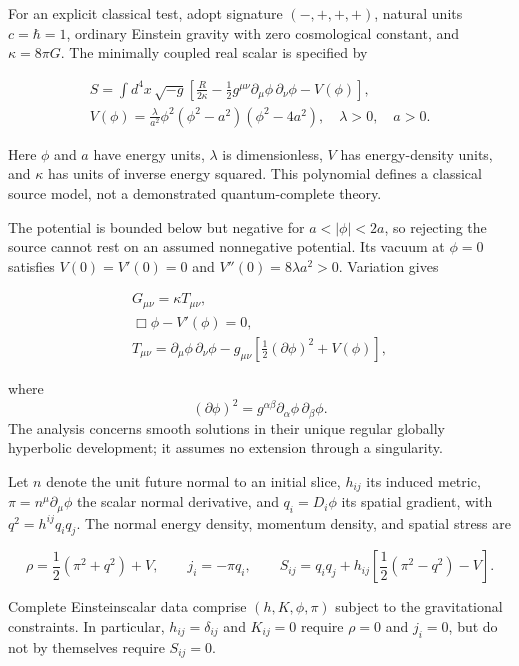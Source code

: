 \documentclass[11pt]{article}
\begin{document}
For an explicit classical test, adopt signature $(-,+,+,+)$, natural units $c=\hbar=1$, ordinary Einstein gravity with zero cosmological constant, and $\kappa=8\pi G$. The minimally coupled real scalar is specified by

\[\begin{gathered}S=\int d^4x\,\sqrt{-g}\left[\frac{R}{2\kappa}-\frac12 g^{\mu\nu}\partial_\mu\phi\,\partial_\nu\phi-V(\phi)\right], \\ V(\phi)=\frac{\lambda}{a^2}\phi^2(\phi^2-a^2)(\phi^2-4a^2),\quad \lambda>0,\quad a>0.\end{gathered}\]

Here $\phi$ and $a$ have energy units, $\lambda$ is dimensionless, $V$ has energy-density units, and $\kappa$ has units of inverse energy squared. This polynomial defines a classical source model, not a demonstrated quantum-complete theory.

The potential is bounded below but negative for $a<|\phi|<2a$, so rejecting the source cannot rest on an assumed nonnegative potential. Its vacuum at $\phi=0$ satisfies $V(0)=V'(0)=0$ and $V''(0)=8\lambda a^2>0$. Variation gives

\[\begin{gathered}G_{\mu\nu}=\kappa T_{\mu\nu}, \\ \Box\phi-V'(\phi)=0, \\ T_{\mu\nu}=\partial_\mu\phi\,\partial_\nu\phi-g_{\mu\nu}\left[\frac12(\partial\phi)^2+V(\phi)\right],\end{gathered}\]

where \[(\partial\phi)^2=g^{\alpha\beta}\partial_\alpha\phi\,\partial_\beta\phi.\] The analysis concerns smooth solutions in their unique regular globally hyperbolic development; it assumes no extension through a singularity.

Let $n$ denote the unit future normal to an initial slice, $h_{ij}$ its induced metric, $\pi=n^\mu\partial_\mu\phi$ the scalar normal derivative, and $q_i=D_i\phi$ its spatial gradient, with $q^2=h^{ij}q_iq_j$. The normal energy density, momentum density, and spatial stress are

\[\rho=\frac12(\pi^2+q^2)+V,\qquad j_i=-\pi q_i,\qquad S_{ij}=q_iq_j+h_{ij}\left[\frac12(\pi^2-q^2)-V\right].\]

Complete Einstein\textendash{}\allowbreak{}scalar data comprise $(h,K,\phi,\pi)$ subject to the gravitational constraints. In particular, $h_{ij}=\delta_{ij}$ and $K_{ij}=0$ require $\rho=0$ and $j_i=0$, but do not by themselves require $S_{ij}=0$.
\end{document}
